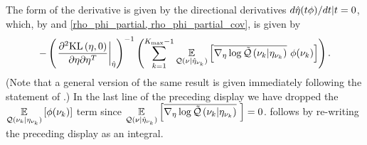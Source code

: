 The form of the derivative is given by the directional derivatives $d \hat\eta(t
\phi) / dt | t = 0$, which, by  and \eqref{rho_phi_partial,
rho_phi_partial_cov}, is given by
%
\begin{align*}
%
-\left(\fracat{\partial^2 \KL{\eta, \phiz}}
                {\partial \eta \partial \eta^T}
                {\etaopt}\right)^{-1}
\left(
    \sumkm \expect{\q(\nu \vert \etaoptnuk)}
                  {\lqgradbar{\nuk \vert \etanuk}
                   \phi(\nuk) }
\right).
%
\end{align*}
%
(Note that a general version of the same result is given immediately following
the statement of \citet[Theorem 4.B(c)]{zeidler:2013:functional}.)  In the last
line of the preceding display we have dropped the $\underset{\mathcal{Q}(\nu_{k} \vert
\eta_{\nu_{k}})}{\mathbb{E}}\left[\phi(\nu_{k})\right]$ term since $\underset{\mathcal{Q}(\nu \vert \hat\eta_{\nu_{k}})}{\mathbb{E}}\left[\overline{{\nabla_\eta \log \tilde{\mathcal{Q}}}\left(\nu_{k} \vert \eta_{\nu_{k}}\right)}\,\,\right] = 0$.   follows by
re-writing the preceding display as an integral.
%
